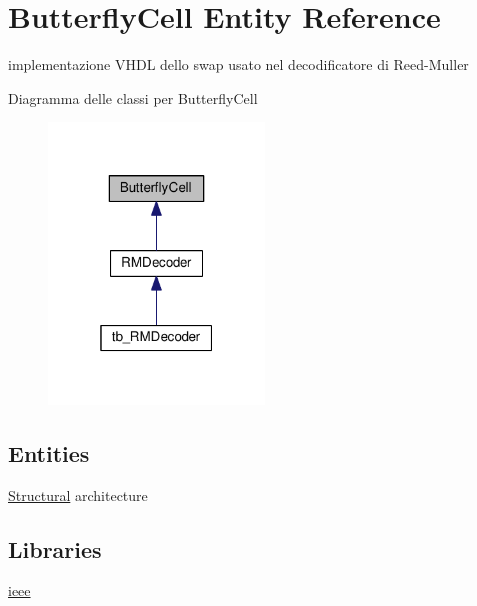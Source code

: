 \hypertarget{class_butterfly_cell}{\section{Butterfly\+Cell Entity Reference}
\label{class_butterfly_cell}
}


implementazione V\+H\+D\+L dello swap usato nel decodificatore di Reed-\/\+Muller  




Diagramma delle classi per Butterfly\+Cell\nopagebreak
\begin{figure}[H]
\begin{center}
\leavevmode
\includegraphics[width=163pt]{class_butterfly_cell__inherit__graph}
\end{center}
\end{figure}
\subsection*{Entities}
\begin{DoxyCompactItemize}
\item 
\hyperlink{class_butterfly_cell_1_1_structural}{Structural} architecture
\end{DoxyCompactItemize}
\subsection*{Libraries}
 \begin{DoxyCompactItemize}
\item 
\hypertarget{class_butterfly_cell_ga0a6af6eef40212dbaf130d57ce711256}{\hyperlink{group___r_m_decoder_ga0a6af6eef40212dbaf130d57ce711256}{ieee} }\label{class_butterfly_cell_ga0a6af6eef40212dbaf130d57ce711256}

\end{DoxyCompactItemize}
